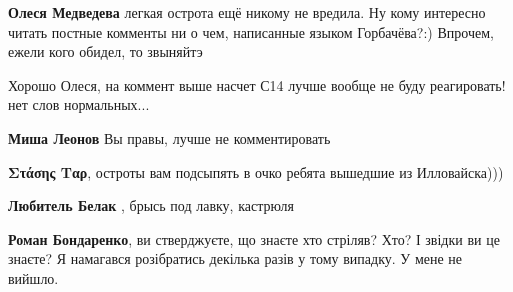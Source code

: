 \begin{itemize}
\begin{itemize}
\textbf{Олеся Медведева} легкая острота ещё никому не вредила. Ну кому
интересно читать постные комменты ни о чем, написанные языком Горбачёва?:)
Впрочем, ежели кого обидел, то звыняйтэ

 
Хорошо Олеся, на коммент выше насчет С14 лучше вообще не буду реагировать! нет слов нормальных...

 
\textbf{Миша Леонов} Вы правы, лучше не комментировать

 
\textbf{Στάσης Ταρ}, остроты вам подсыпять в очко ребята вышедшие из Илловайска)))

 
\textbf{Любитель Белак} , брысь под лавку, кастрюля

 
\textbf{Роман Бондаренко}, ви стверджуєте, що знаєте хто стріляв? Хто? І звідки
ви це знаєте? Я намагався розібратись декілька разів у тому випадку. У мене не
вийшло.

 


\end{itemize}
\end{itemize}
